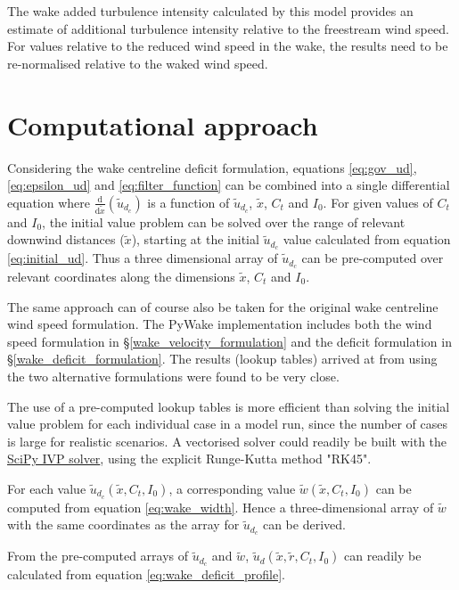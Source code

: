\documentclass[11pt,a4paper]{article}
\begin{document}
The wake added turbulence intensity calculated by this model provides an estimate of additional turbulence intensity relative to the freestream wind speed. For values relative to the reduced wind speed in the wake, the results need to be re-normalised relative to the waked wind speed.

\section{Computational approach}\label{computational_approach}

Considering the wake centreline deficit formulation, equations \ref{eq:gov_ud}, \ref{eq:epsilon_ud} and \ref{eq:filter_function} can be combined into a single differential equation where $\frac{\textrm{d}}{\textrm{d}\tilde{x}}(\tilde{u}_{d_{c}})$ is a function of $\tilde{u}_{d_{c}}$, $\tilde{x}$, $C_{t}$ and $I_{0}$. For given values of $C_{t}$ and $I_{0}$, the initial value problem can be solved over the range of relevant downwind distances ($\tilde{x}$), starting at the initial $\tilde{u}_{d_{c}}$ value calculated from equation \ref{eq:initial_ud}. Thus a three dimensional array of $\tilde{u}_{d_{c}}$ can be pre-computed over relevant coordinates along the dimensions $\tilde{x}$, $C_{t}$ and $I_{0}$.

The same approach can of course also be taken for the original wake centreline wind speed formulation. The PyWake implementation includes both the wind speed formulation in §\ref{wake_velocity_formulation} and the deficit formulation in §\ref{wake_deficit_formulation}. The results (lookup tables) arrived at from using the two alternative formulations were found to be very close.

The use of a pre-computed lookup tables is more efficient than solving the initial value problem for each individual case in a model run, since the number of cases is large for realistic scenarios. A vectorised solver could readily be built with the \href{https://docs.scipy.org/doc/scipy/reference/generated/scipy.integrate.solve_ivp.html}{SciPy IVP solver}, using the explicit Runge-Kutta method "RK45".

For each value $\tilde{u}_{d_{c}}(\tilde{x}, C_{t}, I_{0})$, a corresponding value $\tilde{w}(\tilde{x}, C_{t}, I_{0})$ can be computed from equation \ref{eq:wake_width}. Hence a three-dimensional array of $\tilde{w}$ with the same coordinates as the array for $\tilde{u}_{d_{c}}$ can be derived.

From the pre-computed arrays of $\tilde{u}_{d_{c}}$ and $\tilde{w}$, $\tilde{u}_{d}(\tilde{x}, \tilde{r}, C_{t}, I_{0})$ can readily be calculated from equation \ref{eq:wake_deficit_profile}.
\end{document}
